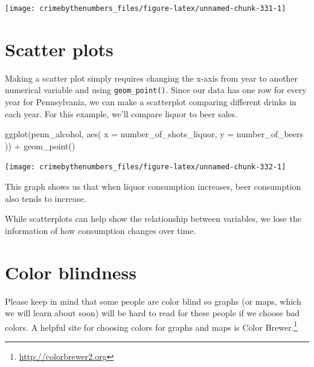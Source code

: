 \documentclass[
]{krantz}
\makeatletter
\newenvironment{Shaded}{\begin{snugshade}}{\end{snugshade}}
\newcommand{\AttributeTok}[1]{\textcolor[rgb]{0.61,0.61,0.61}{#1}}
\newcommand{\FunctionTok}[1]{\textcolor[rgb]{0,0,0}{#1}}
\newcommand{\NormalTok}[1]{#1}
\newcommand{\SpecialCharTok}[1]{\textcolor[rgb]{0,0,0}{#1}}
\renewcommand{\href}[2]{#2\footnote{\url{#1}}}
\newenvironment{kframe}{%
\medskip{}
\setlength{\fboxsep}{.8em}
 \def\at@end@of@kframe{}%
 \ifinner\ifhmode%
  \def\at@end@of@kframe{\end{minipage}}%
  \begin{minipage}{\columnwidth}%
 \fi\fi%
 \def\FrameCommand##1{\hskip\@totalleftmargin \hskip-\fboxsep
 \colorbox{shadecolor}{##1}\hskip-\fboxsep
     \hskip-\linewidth \hskip-\@totalleftmargin \hskip\columnwidth}%
 \MakeFramed {\advance\hsize-\width
   \@totalleftmargin\z@ \linewidth\hsize
   \@setminipage}}%
 {\par\unskip\endMakeFramed%
 \at@end@of@kframe}
\renewenvironment{Shaded}{\begin{kframe}}{\end{kframe}}
\makeatother
\begin{document}
\begin{center}\texttt{[image: crimebythenumbers\_files/figure-latex/unnamed-chunk-331-1]} \end{center}

\hypertarget{scatter-plots}{%
\section{Scatter plots}\label{scatter-plots}}

Making a scatter plot simply requires changing the x-axis
from year to another numerical variable and using
\texttt{geom\_point()}. Since our data has one row for every
year for Pennsylvania, we can make a scatterplot comparing
different drinks in each year. For this example, we'll
compare liquor to beer sales.

\begin{Shaded}
\begin{Highlighting}[]
\FunctionTok{ggplot}\NormalTok{(penn\_alcohol, }\FunctionTok{aes}\NormalTok{(}
  \AttributeTok{x =}\NormalTok{ number\_of\_shots\_liquor,}
  \AttributeTok{y =}\NormalTok{ number\_of\_beers}
\NormalTok{)) }\SpecialCharTok{+}
  \FunctionTok{geom\_point}\NormalTok{()}
\end{Highlighting}
\end{Shaded}

\begin{center}\texttt{[image: crimebythenumbers\_files/figure-latex/unnamed-chunk-332-1]} \end{center}

This graph shows us that when liquor consumption increases,
beer consumption also tends to increase.

While scatterplots can help show the relationship between
variables, we lose the information of how consumption
changes over time.

\hypertarget{color-blindness}{%
\section{Color blindness}\label{color-blindness}}

Please keep in mind that some people are color blind so
graphs (or maps, which we will learn about soon) will be
hard to read for these people if we choose bad colors. A
helpful site for choosing colors for graphs and maps is
\href{http://colorbrewer2.org}{Color Brewer.}
\end{document}
